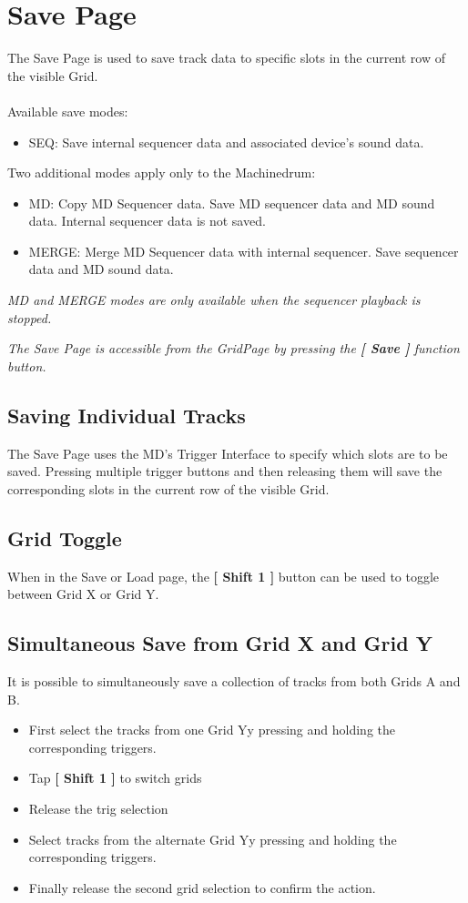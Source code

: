 \chapter{Save Page}

The Save Page is used to save track data to specific slots in the current row of the visible  Grid.\\
\\
Available save modes:
\begin{itemize}
    \item SEQ: Save internal sequencer data and associated device's sound data.
\end{itemize}
Two additional modes apply only to the Machinedrum:
\begin{itemize}
    \item MD: Copy MD Sequencer data. Save MD sequencer data and MD sound data. Internal sequencer data is not saved.
    \item MERGE: Merge MD Sequencer data with internal sequencer. Save sequencer data and MD sound data.
\end{itemize}
\textit{MD and MERGE modes are only available when the sequencer playback is stopped.}
\\



\textit{The Save Page is accessible from the GridPage by pressing the  \textbf{[ Save ]} function button.}


\section{Saving Individual Tracks}
The Save Page uses the MD's Trigger Interface to specify which slots are to be saved. Pressing multiple trigger buttons and then releasing them will save the corresponding slots in the current row of the visible Grid.
\section{Grid Toggle}
When in the Save or Load page, the \textbf{[ Shift 1 ]} button can be used to toggle between Grid X or Grid Y.
\section{Simultaneous Save from Grid X and Grid Y}
It is possible to simultaneously save a collection of tracks from both Grids A and B. 
\begin{itemize}
\item First select the tracks from one Grid Yy pressing and holding the corresponding triggers.
\item Tap \textbf{[ Shift 1 ]} to switch grids
\item Release the trig selection
\item Select tracks from the alternate Grid Yy pressing and holding the corresponding triggers. 
\item Finally release the second grid selection to confirm the action. 
\end{itemize}

